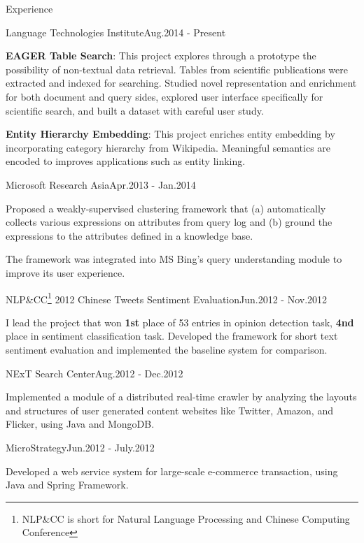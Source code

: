 \documentclass{resume} %
\begin{document}
\begin{rSection}{Experience}
\begin{rSubsection}{Language Technologies Institute}{Aug.2014 - Present}{}{}
\item \textbf{EAGER Table Search}: This project explores through a prototype the possibility of non-textual data retrieval.
Tables from scientific publications were extracted and indexed for searching.  Studied novel representation and enrichment
for both document and query sides, explored user interface specifically for scientific search, and built a dataset with
careful user study.
\item \textbf{Entity Hierarchy Embedding}: This project enriches entity embedding by incorporating category hierarchy from Wikipedia.
Meaningful semantics are encoded to improves applications such as entity linking.
\end{rSubsection}

\begin{rSubsection}{Microsoft Research Asia}{Apr.2013 - Jan.2014}{}{}
\item Proposed a weakly-supervised clustering framework that (a) automatically collects various expressions on attributes from query log and 
(b) ground the expressions to the attributes defined in a knowledge base.
\item The framework was integrated into MS Bing's query understanding module to improve its user experience.
\end{rSubsection}

\begin{rSubsection}{NLP\&CC\footnote{NLP\&CC is short for Natural Language Processing and Chinese Computing Conference} 2012 Chinese Tweets Sentiment Evaluation}{Jun.2012 - Nov.2012}{}{}
\item I lead the project that won \textbf{1st} place of 53 entries in opinion detection task, \textbf{4nd} place in sentiment classification task.
Developed the framework for short text sentiment evaluation and implemented the baseline system for comparison.
\end{rSubsection}


\begin{rSubsection}{NExT Search Center}{Aug.2012 - Dec.2012}{}{}
\item Implemented a module of a distributed real-time crawler by analyzing the layouts and structures of user generated content websites like Twitter, Amazon, and Flicker, using Java and MongoDB.
\end{rSubsection}


\begin{rSubsection}{MicroStrategy}{Jun.2012 - July.2012}{}{}
\item Developed a web service system for large-scale e-commerce transaction, using Java and Spring Framework.
\end{rSubsection}

\end{rSection}
\end{document}
